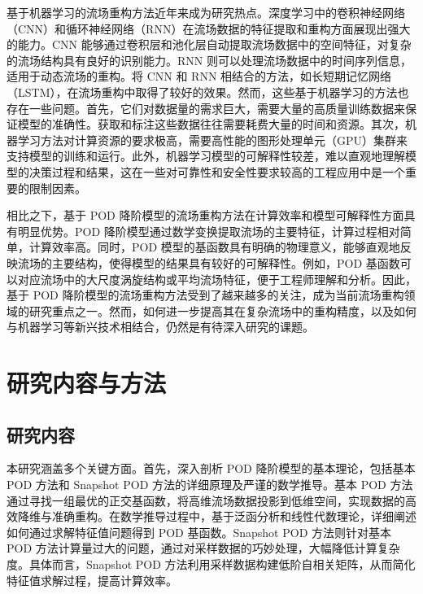 基于机器学习的流场重构方法近年来成为研究热点。深度学习中的卷积神经网络（CNN）和循环神经网络（RNN）在流场数据的特征提取和重构方面展现出强大的能力\cite{Goodfellow2016}。CNN 能够通过卷积层和池化层自动提取流场数据中的空间特征，对复杂的流场结构具有良好的识别能力\cite{Krizhevsky2012}。RNN 则可以处理流场数据中的时间序列信息，适用于动态流场的重构\cite{Hochreiter1997}。将 CNN 和 RNN 相结合的方法，如长短期记忆网络（LSTM），在流场重构中取得了较好的效果\cite{Graves2013}。然而，这些基于机器学习的方法也存在一些问题。首先，它们对数据量的需求巨大，需要大量的高质量训练数据来保证模型的准确性\cite{LeCun2015}。获取和标注这些数据往往需要耗费大量的时间和资源\cite{Sun2021}。其次，机器学习方法对计算资源的要求极高，需要高性能的图形处理单元（GPU）集群来支持模型的训练和运行\cite{Schmidhuber2015}。此外，机器学习模型的可解释性较差，难以直观地理解模型的决策过程和结果\cite{Rudin2019}，这在一些对可靠性和安全性要求较高的工程应用中是一个重要的限制因素\cite{Arrieta2020}。

相比之下，基于 POD 降阶模型的流场重构方法在计算效率和模型可解释性方面具有明显优势。POD 降阶模型通过数学变换提取流场的主要特征，计算过程相对简单，计算效率高\cite{Berkooz1993}。同时，POD 模型的基函数具有明确的物理意义，能够直观地反映流场的主要结构，使得模型的结果具有较好的可解释性\cite{Holmes2012}。例如，POD 基函数可以对应流场中的大尺度涡旋结构或平均流场特征\cite{Lumley2017}，便于工程师理解和分析。因此，基于 POD 降阶模型的流场重构方法受到了越来越多的关注，成为当前流场重构领域的研究重点之一\cite{Taira2020}。然而，如何进一步提高其在复杂流场中的重构精度，以及如何与机器学习等新兴技术相结合\cite{Carlberg2023}，仍然是有待深入研究的课题。
\section{研究内容与方法}
\subsection{研究内容}
本研究涵盖多个关键方面。首先，深入剖析 POD 降阶模型的基本理论，包括基本 POD 方法和 Snapshot POD 方法的详细原理及严谨的数学推导。基本 POD 方法通过寻找一组最优的正交基函数，将高维流场数据投影到低维空间，实现数据的高效降维与准确重构。在数学推导过程中，基于泛函分析和线性代数理论，详细阐述如何通过求解特征值问题得到 POD 基函数。Snapshot POD 方法则针对基本 POD 方法计算量过大的问题，通过对采样数据的巧妙处理，大幅降低计算复杂度。具体而言，Snapshot POD 方法利用采样数据构建低阶自相关矩阵，从而简化特征值求解过程，提高计算效率。

